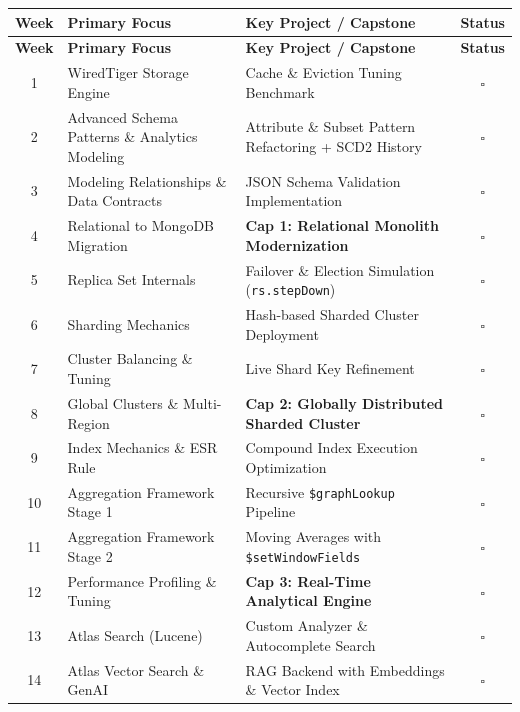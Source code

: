 \documentclass[11pt, a4paper]{article}
\begin{document}
\begin{center}
\renewcommand{\arraystretch}{1.5}
\begin{longtable}{@{} c l p{7cm} c @{}}
\toprule
\textbf{Week} & \textbf{Primary Focus} & \textbf{Key Project / Capstone} & \textbf{Status} \\ 
\midrule
\endfirsthead

\toprule
\textbf{Week} & \textbf{Primary Focus} & \textbf{Key Project / Capstone} & \textbf{Status} \\ 
\midrule
\endhead

\bottomrule
\endfoot

\bottomrule
\endlastfoot

1 & WiredTiger Storage Engine & Cache \& Eviction Tuning Benchmark & $\square$ \\
2 & Advanced Schema Patterns \& Analytics Modeling & Attribute \& Subset Pattern Refactoring + SCD2 History & $\square$ \\
3 & Modeling Relationships \& Data Contracts & JSON Schema Validation Implementation & $\square$ \\
4 & Relational to MongoDB Migration & \textbf{Cap 1: Relational Monolith Modernization} & $\square$ \\
\midrule
5 & Replica Set Internals & Failover \& Election Simulation (\texttt{rs.stepDown}) & $\square$ \\
6 & Sharding Mechanics & Hash-based Sharded Cluster Deployment & $\square$ \\
7 & Cluster Balancing \& Tuning & Live Shard Key Refinement & $\square$ \\
8 & Global Clusters \& Multi-Region & \textbf{Cap 2: Globally Distributed Sharded Cluster} & $\square$ \\
\midrule
9 & Index Mechanics \& ESR Rule & Compound Index Execution Optimization & $\square$ \\
10 & Aggregation Framework Stage 1 & Recursive \texttt{\$graphLookup} Pipeline & $\square$ \\
11 & Aggregation Framework Stage 2 & Moving Averages with \texttt{\$setWindowFields} & $\square$ \\
12 & Performance Profiling \& Tuning & \textbf{Cap 3: Real-Time Analytical Engine} & $\square$ \\
\midrule
13 & Atlas Search (Lucene) & Custom Analyzer \& Autocomplete Search & $\square$ \\
14 & Atlas Vector Search \& GenAI & RAG Backend with Embeddings \& Vector Index & $\square$ \\

\end{longtable}
\end{center}
\end{document}
